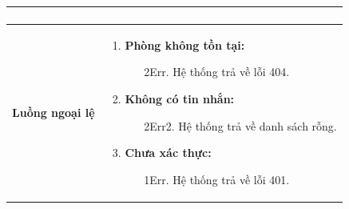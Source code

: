 {\begin{tabularx}{\textwidth}{|>{\raggedright\arraybackslash}X|>{\raggedright\arraybackslash}X|}
\begin{enumerate}
\begin{enumerate}
    \end{enumerate}
\end{enumerate} \\
\hline
\textbf{Luồng ngoại lệ} &
\begin{enumerate}
    \item \textbf{Phòng không tồn tại:}
    \begin{enumerate}
        \item[2Err.] Hệ thống trả về lỗi 404.
    \end{enumerate}
    \item \textbf{Không có tin nhắn:}
    \begin{enumerate}
        \item[2Err2.] Hệ thống trả về danh sách rỗng.
    \end{enumerate}
    \item \textbf{Chưa xác thực:}
    \begin{enumerate}
        \item[1Err.] Hệ thống trả về lỗi 401.
    \end{enumerate}
\end{enumerate} \\
\hline
\end{tabularx}
}
